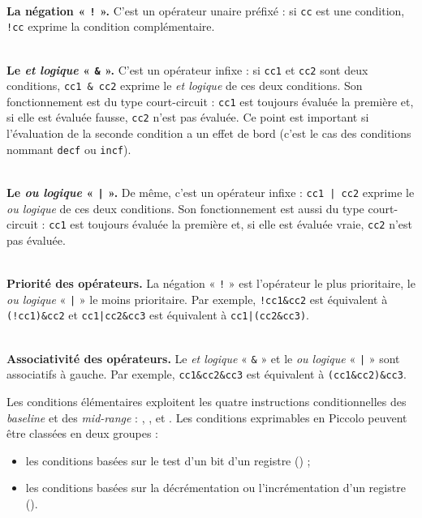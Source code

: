 ~\\
\textbf{La négation « \texttt{!} ».} C'est un opérateur unaire préfixé : si \texttt{cc} est une condition, \texttt{!cc} exprime la condition complémentaire. %


~\\
\textbf{Le \emph{et logique} « \texttt{\&} ».} C'est un opérateur infixe : si \texttt{cc1} et \texttt{cc2} sont deux conditions, \texttt{cc1 \& cc2} exprime le \emph{et logique} de ces deux conditions. Son fonctionnement est du type court-circuit : \texttt{cc1} est toujours évaluée la première et, si elle est évaluée fausse, \texttt{cc2} n'est pas évaluée. Ce point est important si l'évaluation de la seconde condition a un effet de bord (c'est le cas des conditions nommant \texttt{decf} ou \texttt{incf}).

~\\
\textbf{Le \emph{ou logique} « \texttt{|} ».} De même, c'est un opérateur infixe : \texttt{cc1 | cc2} exprime le \emph{ou logique} de ces deux conditions. Son fonctionnement est aussi du type court-circuit : \texttt{cc1} est toujours évaluée la première et, si elle est évaluée vraie, \texttt{cc2} n'est pas évaluée.

~\\
\textbf{Priorité des opérateurs.} La négation « \texttt{!} » est l'opérateur le plus prioritaire, le \emph{ou logique} « \texttt{|} » le moins prioritaire. Par exemple, \texttt{!cc1\&cc2} est équivalent à \texttt{(!cc1)\&cc2} et \texttt{cc1|cc2\&cc3} est équivalent à \texttt{cc1|(cc2\&cc3)}.

~\\
\textbf{Associativité des opérateurs.} Le \emph{et logique} « \texttt{\&} » et le \emph{ou logique} « \texttt{|} » sont associatifs à gauche. Par exemple, \texttt{cc1\&cc2\&cc3} est équivalent à \texttt{(cc1\&cc2)\&cc3}.



Les conditions élémentaires exploitent les quatre instructions conditionnelles des \emph{baseline} et des \emph{mid-range} : , ,  et . Les conditions exprimables en Piccolo peuvent être classées en deux groupes :
\begin{itemize}
  \item les conditions basées sur le test d'un bit d'un registre () ;
  \item les conditions basées sur la décrémentation ou l'incrémentation d'un registre ().
\end{itemize}


